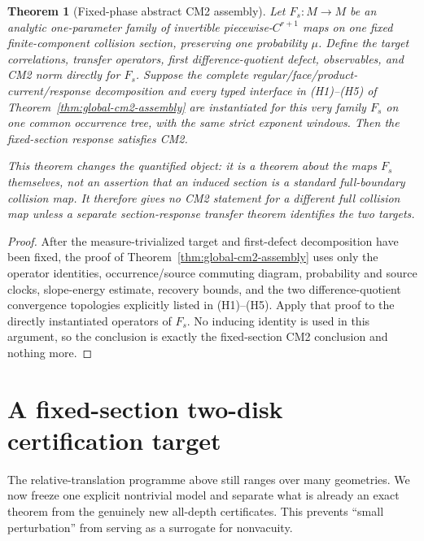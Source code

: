 \documentclass[11pt]{article}
\newtheorem{theorem}{Theorem}[section]
\begin{document}
\begin{theorem}[Fixed-phase abstract CM2 assembly]
\label{thm:fixed-phase-cm2-assembly}
Let $F_s:M\to M$ be an analytic one-parameter family of invertible
piecewise-$C^{r+1}$ maps on one fixed finite-component collision section,
preserving one probability $\mu$.  Define the target correlations, transfer
operators, first difference-quotient defect, observables, and CM2 norm directly
for $F_s$.  Suppose the complete regular/face/product-current/response
decomposition and every typed interface in \textup{(H1)--(H5)} of
Theorem~\ref{thm:global-cm2-assembly} are instantiated for this very family
$F_s$ on one common occurrence tree, with the same strict exponent windows.
Then the fixed-section response satisfies CM2.

This theorem changes the quantified object: it is a theorem about the maps
$F_s$ themselves, not an assertion that an induced section is a standard
full-boundary collision map.  It therefore gives no CM2 statement for a
different full collision map unless a separate section-response transfer
theorem identifies the two targets.
\end{theorem}

\begin{proof}
After the measure-trivialized target and first-defect decomposition have been
fixed, the proof of Theorem~\ref{thm:global-cm2-assembly} uses only the
operator identities, occurrence/source commuting diagram, probability and
source clocks, slope-energy estimate, recovery bounds, and the two
difference-quotient convergence topologies explicitly listed in
\textup{(H1)--(H5)}.  Apply that proof to the directly instantiated operators
of $F_s$.  No inducing identity is used in this argument, so the conclusion
is exactly the fixed-section CM2 conclusion and nothing more.
\end{proof}

\section{A fixed-section two-disk certification target}

The relative-translation programme above still ranges over many geometries.
We now freeze one explicit nontrivial model and separate what is already an
exact theorem from the genuinely new all-depth certificates.  This prevents
``small perturbation'' from serving as a surrogate for nonvacuity.
\end{document}
